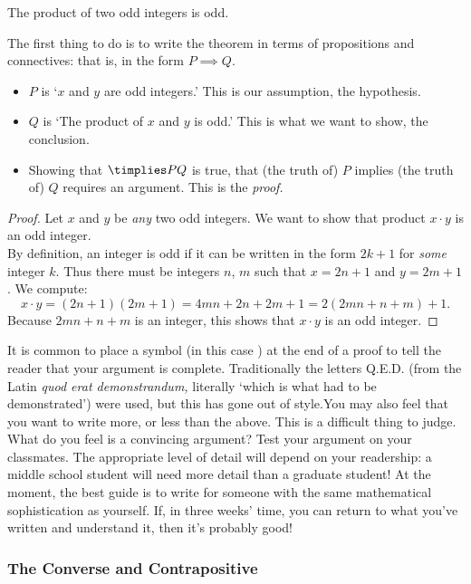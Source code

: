 \begin{thm}
The product of two odd integers is odd.
\end{thm}

\noindent The first thing to do is to write the theorem in terms of propositions and connectives: that is, in the form $P\implies Q$.
\begin{itemize}
  \item $P$ is `$x$ and $y$ are odd integers.' This is our assumption, the hypothesis.
  \item $Q$ is `The product of $x$ and $y$ is odd.' This is what we want to show, the conclusion.
  \item Showing that $\timplies PQ$ is true, that (the truth of) $P$ implies (the truth of) $Q$ requires an argument. This is the \emph{proof.}
\end{itemize}

\begin{proof}
Let $x$ and $y$ be \emph{any} two odd integers. We want to show that product $x\cdot y$ is an odd integer. \\
By definition, an integer is odd if it can be written in the form $2k+1$ for \emph{some} integer $k$. Thus there must be integers $n$, $m$ such that $x=2n+1$ and $y=2m+1$. We compute:
\[x\cdot y=(2n+1)(2m+1)=4mn+2n+2m+1=2(2mn+n+m)+1.\]
Because $2mn+n+m$ is an integer, this shows that $x\cdot y$ is an odd integer.
\end{proof}

\noindent It is common to place a symbol (in this case \smash{\raisebox{7pt}{$\qedsymbol$}}) at the end of a proof to tell the reader that your argument is complete. Traditionally the letters Q.E.D. (from the Latin \emph{quod erat demonstrandum,} literally `which is what had to be demonstrated') were used, but this has gone out of style.You may also feel that you want to write more, or less than the above. This is a difficult thing to judge. What do you feel is a convincing argument? Test your argument on your classmates. The appropriate level of detail will depend on your readership: a middle school student will need more detail than a graduate student! At the moment, the best guide is to write for someone with the same mathematical sophistication as yourself. If, in three weeks' time, you can return to what you've written and understand it, then it's probably good!


\subsubsection*{The Converse and Contrapositive}

